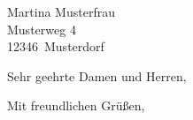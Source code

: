 \documentclass[12pt,ngerman]{scrartcl}
\begin{document}
 
\blindtext[3]
 
 
\begin{letter}{Martina Musterfrau \\ Musterweg 4 \\ 12346~Musterdorf}
\opening{Sehr geehrte Damen und Herren,}
 
\closing{Mit freundlichen Grüßen,}
\end{letter}
 
\end{document}
